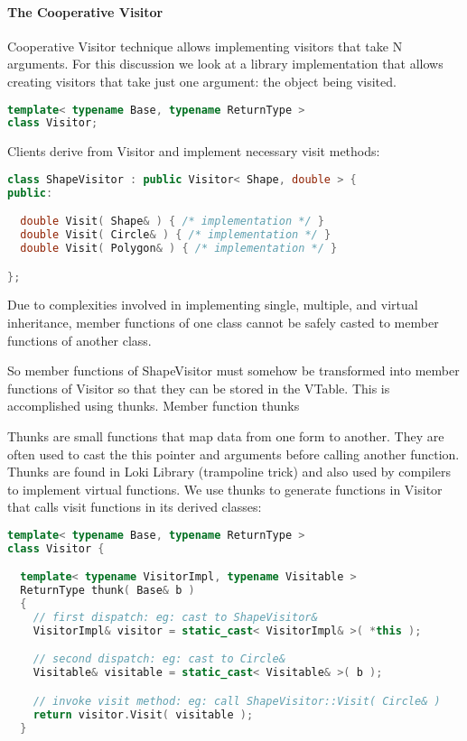\documentclass{book}
\begin{document}
\paragraph{The Cooperative Visitor}

Cooperative Visitor technique allows implementing visitors that take N arguments.
For this discussion we look at a library implementation that allows creating visitors that take just one argument: the object being visited.

\begin{lstlisting}[caption={visitor pattern sample code 5, commandexample.cpp},language=C++]
template< typename Base, typename ReturnType >
class Visitor;
\end{lstlisting}

Clients derive from Visitor and implement necessary visit methods:

\begin{lstlisting}[caption={visitor pattern sample code 5, commandexample.cpp},language=C++]
class ShapeVisitor : public Visitor< Shape, double > {
public:

  double Visit( Shape& ) { /* implementation */ }      
  double Visit( Circle& ) { /* implementation */ }      
  double Visit( Polygon& ) { /* implementation */ }     

};
\end{lstlisting}

Due to complexities involved in implementing single, multiple, and virtual inheritance, member functions of one class cannot be safely casted to member functions of another class.

So member functions of ShapeVisitor must somehow be transformed into member functions of Visitor so that they can be stored in the VTable. This is accomplished using thunks.
Member function thunks

Thunks are small functions that map data from one form to another.
They are often used to cast the this pointer and arguments before calling another function.
Thunks are found in Loki Library (trampoline trick) and also used by compilers to implement virtual functions.
We use thunks to generate functions in Visitor that calls visit functions in its derived classes:

\begin{lstlisting}[caption={visitor pattern sample code 5, commandexample.cpp},language=C++]
template< typename Base, typename ReturnType >
class Visitor {

  template< typename VisitorImpl, typename Visitable >
  ReturnType thunk( Base& b )
  {
    // first dispatch: eg: cast to ShapeVisitor&
    VisitorImpl& visitor = static_cast< VisitorImpl& >( *this ); 

    // second dispatch: eg: cast to Circle&
    Visitable& visitable = static_cast< Visitable& >( b );

    // invoke visit method: eg: call ShapeVisitor::Visit( Circle& )
    return visitor.Visit( visitable );
  }
\end{lstlisting}
\end{document}
